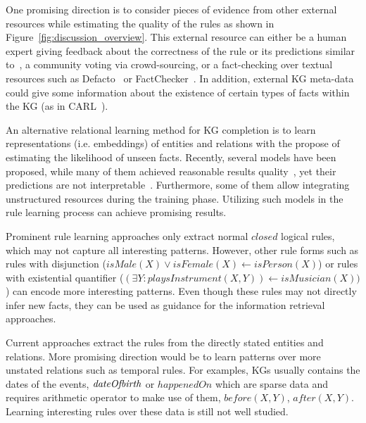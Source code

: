 One promising direction is to consider pieces of evidence from other external resources while estimating the quality of the rules as shown in Figure~\ref{fig:discussion_overview}. This external resource can either be a human expert giving feedback about the correctness of the rule or its predictions similar to~\cite{Dzyuba2017}, a community voting via crowd-sourcing, or a fact-checking over textual resources such as Defacto~\cite{defacto} or FactChecker~\cite{factchecker}. In addition, external KG meta-data could give some information about the existence of certain types of facts within the KG (as in CARL~\cite{carl}).

An alternative relational learning method for KG completion is to learn representations (i.e. embeddings) of entities and relations with the propose of estimating the likelihood of unseen facts. Recently, several models have been proposed, while many of them achieved reasonable results quality~\cite{Wang2017}, yet their predictions are not interpretable~\cite{Shakerin2018}. Furthermore, some of them allow integrating unstructured resources during the training phase. Utilizing such models in the rule learning process can achieve promising results.%

Prominent rule learning approaches only extract normal $closed$ logical rules, which may not capture all interesting patterns. However, other rule forms such as rules with disjunction (\eg $isMale(X) \vee isFemale(X) \leftarrow isPerson(X)$) or rules with existential quantifier (\eg $(\exists Y: playsInstrument(X, Y)) \leftarrow isMusician(X))$) can encode more interesting patterns. Even though these rules may not directly infer new facts, they can be used as guidance for the information retrieval approaches.


 Current approaches extract the rules from the directly stated entities and relations. More promising direction would be to learn patterns over more unstated relations such as temporal rules. For examples, KGs usually contains the dates of the events, \eg $\mathit{dateOfbirth}$ or $happenedOn$ which are sparse data and requires arithmetic operator to make use of them, \eg $before(X,Y)$, $after(X,Y)$. Learning interesting rules over these data is still not well studied.


